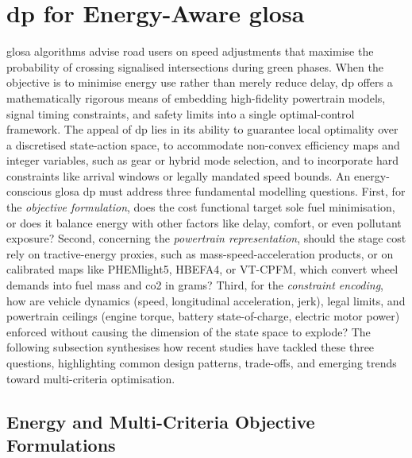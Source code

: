 \section{\acl{dp} for Energy-Aware \acs{glosa}}
\label{sec:eco_glosa}

\ac{glosa} algorithms advise road users on speed adjustments that maximise the probability of crossing signalised intersections during green phases. When the objective is to minimise energy use rather than merely reduce delay, \ac{dp} offers a mathematically rigorous means of embedding high-fidelity powertrain models, signal timing constraints, and safety limits into a single optimal-control framework. The appeal of \ac{dp} lies in its ability to guarantee local optimality over a discretised state-action space, to accommodate non-convex efficiency maps and integer variables, such as gear or hybrid mode selection, and to incorporate hard constraints like arrival windows or legally mandated speed bounds.
\mynewline
An energy-conscious \ac{glosa} \ac{dp} must address three fundamental modelling questions. First, for the \textit{objective formulation}, does the cost functional target sole fuel minimisation, or does it balance energy with other factors like delay, comfort, or even pollutant exposure? Second, concerning the \textit{powertrain representation}, should the stage cost rely on tractive-energy proxies, such as mass-speed-acceleration products, or on calibrated maps like PHEMlight5, HBEFA4, or VT-CPFM, which convert wheel demands into fuel mass and \ac{co2} in grams? Third, for the \textit{constraint encoding}, how are vehicle dynamics (speed, longitudinal acceleration, jerk), legal limits, and powertrain ceilings (engine torque, battery state-of-charge, electric motor power) enforced without causing the dimension of the state space to explode? The following subsection synthesises how recent studies have tackled these three questions, highlighting common design patterns, trade-offs, and emerging trends toward multi-criteria optimisation.

\subsection{Energy and Multi-Criteria Objective Formulations}
\label{subsec:eco_dp_objectives}

